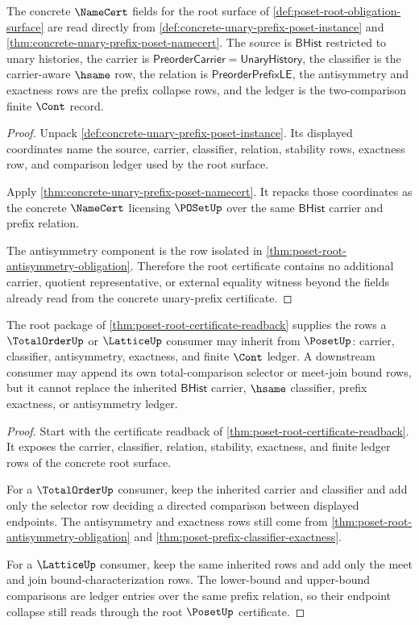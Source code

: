 \begin{theorem}\label{thm:poset-root-certificate-readback}
The concrete $\NameCert$ fields for the root surface of
\autoref{def:poset-root-obligation-surface} are read directly from
\autoref{def:concrete-unary-prefix-poset-instance} and
\autoref{thm:concrete-unary-prefix-poset-namecert}. The source is
$\mathsf{BHist}$ restricted to unary histories, the carrier is
$\mathsf{PreorderCarrier}=\mathsf{UnaryHistory}$, the classifier is the
carrier-aware $\hsame$ row, the relation is $\mathsf{PreorderPrefixLE}$, the
antisymmetry and exactness rows are the prefix collapse rows, and the ledger is
the two-comparison finite $\Cont$ record.
\end{theorem}
\begin{proof}
Unpack \autoref{def:concrete-unary-prefix-poset-instance}. Its displayed
coordinates name the source, carrier, classifier, relation, stability rows,
exactness row, and comparison ledger used by the root surface.

Apply \autoref{thm:concrete-unary-prefix-poset-namecert}. It repacks those
coordinates as the concrete $\NameCert$ licensing $\POSetUp$ over the same
$\mathsf{BHist}$ carrier and prefix relation.

The antisymmetry component is the row isolated in
\autoref{thm:poset-root-antisymmetry-obligation}. Therefore the root
certificate contains no additional carrier, quotient representative, or
external equality witness beyond the fields already read from the concrete
unary-prefix certificate.
\end{proof}

\begin{theorem}\label{thm:poset-root-downstream-unblock-package}
The root package of \autoref{thm:poset-root-certificate-readback} supplies the
rows a $\TotalOrderUp$ or $\LatticeUp$ consumer may inherit from $\PosetUp$:
carrier, classifier, antisymmetry, exactness, and finite $\Cont$ ledger. A
downstream consumer may append its own total-comparison selector or meet-join
bound rows, but it cannot replace the inherited $\mathsf{BHist}$ carrier,
$\hsame$ classifier, prefix exactness, or antisymmetry ledger.
\end{theorem}
\begin{proof}
Start with the certificate readback of
\autoref{thm:poset-root-certificate-readback}. It exposes the carrier,
classifier, relation, stability, exactness, and finite ledger rows of the
concrete root surface.

For a $\TotalOrderUp$ consumer, keep the inherited carrier and classifier and
add only the selector row deciding a directed comparison between displayed
endpoints. The antisymmetry and exactness rows still come from
\autoref{thm:poset-root-antisymmetry-obligation} and
\autoref{thm:poset-prefix-classifier-exactness}.

For a $\LatticeUp$ consumer, keep the same inherited rows and add only the
meet and join bound-characterization rows. The lower-bound and upper-bound
comparisons are ledger entries over the same prefix relation, so their
endpoint collapse still reads through the root $\PosetUp$ certificate.
\end{proof}

